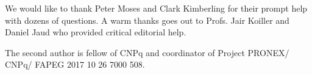 We would like to thank Peter Moses and Clark Kimberling for their prompt help with dozens of questions. A warm thanks goes out to Profs. Jair Koiller and Daniel Jaud who provided critical editorial help.

The second author is fellow of CNPq and coordinator of Project PRONEX/ CNPq/ FAPEG 2017 10 26 7000 508.